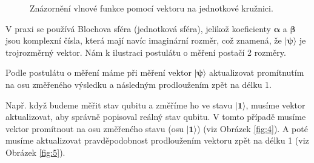 \begin{figure}[ht]

    \centering

    \caption{\label{fig:3}Znázornění vlnové funkce pomocí vektoru na jednotkové kružnici.}
\end{figure}


V praxi se používá Blochova sféra (jednotková sféra), jelikož koeficienty $\bm{\alpha}$ a $\bm{\beta}$ jsou komplexní čísla, která mají navíc imaginární rozměr, což znamená, že $\bm{|\psi\rangle}$ je trojrozměrný vektor. Nám k ilustraci postulátu o měření postačí 2 rozměry.

Podle postulátu o měření máme při měření vektor $\bm{|\psi\rangle}$ aktualizovat promítnutím na osu změře\-ného výsledku a následným prodloužením zpět na délku 1.

Např. když budeme měřit stav qubitu a změříme ho ve stavu $\bm{|1\rangle}$, musíme vektor aktualizovat, aby správně popisoval reálný stav qubitu. V tomto případě musíme vektor promítnout na osu změřeného stavu (osu $\bm{|1\rangle}$) (viz Obrázek \ref{fig:4}). A poté musíme aktualizovat pravděpodobnost prodloužením vektoru zpět na délku 1 (viz Obrázek \ref{fig:5}).

